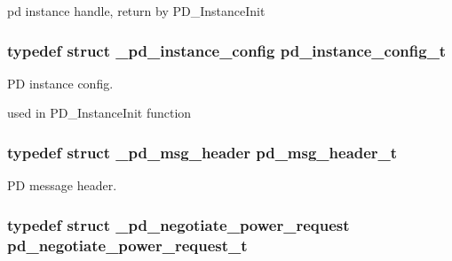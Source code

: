 pd instance handle, return by P\-D\-\_\-\-Instance\-Init 

\hypertarget{group__usb__pd__stack_gafa6034f9e204836697da1f2fc996cbad}{
\subsubsection[{pd\-\_\-instance\-\_\-config\-\_\-t}]{\setlength{\rightskip}{0pt plus 5cm}typedef struct {\bf \-\_\-pd\-\_\-instance\-\_\-config}  {\bf pd\-\_\-instance\-\_\-config\-\_\-t}}}\label{group__usb__pd__stack_gafa6034f9e204836697da1f2fc996cbad}


P\-D instance config. 

used in P\-D\-\_\-\-Instance\-Init function \hypertarget{group__usb__pd__stack_ga38ef16bfe01e9e07d6b3ac77648c6bee}{
\subsubsection[{pd\-\_\-msg\-\_\-header\-\_\-t}]{\setlength{\rightskip}{0pt plus 5cm}typedef struct {\bf \-\_\-pd\-\_\-msg\-\_\-header}  {\bf pd\-\_\-msg\-\_\-header\-\_\-t}}}\label{group__usb__pd__stack_ga38ef16bfe01e9e07d6b3ac77648c6bee}


P\-D message header. 

\hypertarget{group__usb__pd__stack_ga0abf4b4d469dc62a548c2d41f6f4219b}{
\subsubsection[{pd\-\_\-negotiate\-\_\-power\-\_\-request\-\_\-t}]{\setlength{\rightskip}{0pt plus 5cm}typedef struct {\bf \-\_\-pd\-\_\-negotiate\-\_\-power\-\_\-request}  {\bf pd\-\_\-negotiate\-\_\-power\-\_\-request\-\_\-t}}}\label{group__usb__pd__stack_ga0abf4b4d469dc62a548c2d41f6f4219b}


